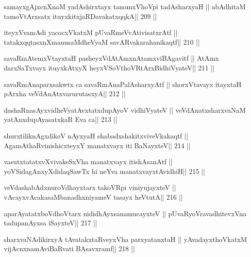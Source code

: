 \begin{shl}
samayxgAjxcnXnaM yadAshirxtayx tanomxVhoV\s pi tadAsharxyaH ||
abAdhitaM tamoV\s tArx\s\s satx ituyxkitxjaRDavakatxqqkA\hfill || 209 ||
\end{shl}

\begin{shl}
iteyxVvamAdi yacocxVkatxM pUvaRmeVvAtivisatxrAtf ||
tatakxqqtasxnXmanusaMdheVyaM savARvakarahanikaqtf\hfill || 210 ||
\end{shl}

\begin{shl}
savaRmAtemxVtayxtaH pasheyxVdAtAmxnAtamxviBAgavitf ||
AtAmx darxSaTxvayx ituyxkAtxyX heyxVSoV\s thoVR\s tArxBidhiVyateV\hfill || 211 ||
\end{shl}

\begin{shl}
savaRmAnaparxsakwtx ca savaRmAnaPalAsharxyAtf ||
shorxVtavayx itayxtaH pArxha veVdAnAtxvarurutasxyA\hfill || 212 ||
\end{shl}

\begin{shl}
dashaRnasAyxvidheVyatAvxtatxdupAyoV vidhiVyateV ||
veVdAnatxsharxvaNaM yatAnxdupAyasatxkaR Eva ca\hfill || 213 ||
\end{shl}

\begin{shl}
shurxtiliknAgxdikoV nAyxyaH shabadxshakitxviveVkakaqtf ||
AgamAthaRvinishicxteyxY manatxvayx iti BaNayxteV\hfill || 214 ||
\end{shl}

\begin{shl}
vasutxtatatxvXvivakeSxVha manatxvayx itishAsanAtf ||
yoVSidagAnxyXdidaqSawTx hi neYva manatxvayxtAvidhiH\hfill || 215 ||
\end{shl}

\begin{shl}
veVdashabAdxnuroVdhayxtarx takoVR\s pi viniyujayxteV ||
vAcayxvAcakasaMbanadhxniyameV tasayx heVtutA\hfill || 216 ||
\end{shl}

\begin{shl}
aparAyatatxboVdhoV\s tarx nididhAyxsanamucayxteV ||
pUvaRyoVravadhitevxVna tadupanAyxsa iSayxteV\hfill || 217 ||
\end{shl}

\begin{shl}
sharxvaNAdikirxyA tAvatakxtaRveyxVha parxyatanxtaH ||
yAvadayxthoVkatxM vijAcnxnamAviBaRvati BAsavxramf\hfill || 218 ||
\end{shl}

